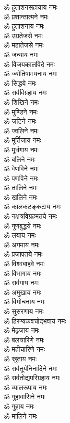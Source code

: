 \begin{multicols}{2}
\begin{flushleft}
ॐ हुताशनसहायाय नमः\\
ॐ प्रशान्तात्मने नमः\hfill{}\\
ॐ हुताशनाय नमः\\
ॐ उग्रतेजसे नमः\\
ॐ महातेजसे नमः\\
ॐ जन्याय नमः\\
ॐ विजयकालविदे नमः\\
ॐ ज्योतिषामयनाय नमः\\
ॐ सिद्धये नमः\\
ॐ सर्वविग्रहाय नमः\\
ॐ शिखिने नमः\\
ॐ मुण्डिने नमः\hfill{}\\
ॐ जटिने नमः\\
ॐ ज्वलिने नमः\\
ॐ मूर्तिजाय नमः\\
ॐ मूर्धगाय नमः\\
ॐ बलिने नमः\\
ॐ वेणविने नमः\\
ॐ पणविने नमः\\
ॐ तालिने नमः\\
ॐ खलिने नमः\\
ॐ कालकटङ्कटाय नमः\hfill{}\\
ॐ नक्षत्रविग्रहमतये नमः\\
ॐ गुणबुद्धये नमः\\
ॐ लयाय नमः\\
ॐ अगमाय नमः\\
ॐ प्रजापतये नमः\\
ॐ विश्वबाहवे नमः\\
ॐ विभागाय नमः\\
ॐ सर्वगाय नमः\\
ॐ अमुखाय नमः\\
ॐ विमोचनाय नमः\hfill{}\\
ॐ सुसरणाय नमः\\
ॐ हिरण्यकवचोद्भवाय नमः\\
ॐ मेढ्रजाय नमः\\
ॐ बलचारिणे नमः\\
ॐ महीचारिणे नमः\\
ॐ स्रुताय नमः\\
ॐ सर्वतूर्यनिनादिने नमः\\
ॐ सर्वतोद्यपरिग्रहाय नमः\\
ॐ व्यालरूपाय नमः\\
ॐ गुहावासिने नमः\hfill{}\\
ॐ गुहाय नमः\\
ॐ मालिने नमः\\

\end{flushleft}
\end{multicols}
